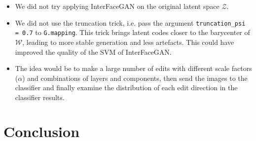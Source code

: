 \documentclass[a4paper]{article}
\begin{document}
\begin{itemize}
    \item We did not try applying InterFaceGAN on the original latent space $\mathcal{Z}$.
    \item We did not use the truncation trick, i.e. pass the argument \texttt{truncation\_psi = 0.7} to \texttt{G.mapping}. This trick brings latent codes closer to the barycenter of $\mathcal{W}$, leading to more stable generation and less artefacts. This could have improved the quality of the SVM of InterFaceGAN.
    \item The idea would be to make a large number of edits with different scale factors ($\alpha$) and combinations of layers and components, then send the images to the classifier and finally examine the distribution of each edit direction in the classifier results.
\end{itemize}

\section{Conclusion}
\end{document}
